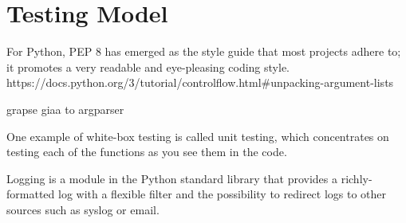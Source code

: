 \section{Testing Model}
For Python, PEP 8 has emerged as the style guide that most projects adhere to; it promotes a very readable and eye-pleasing coding style. https://docs.python.org/3/tutorial/controlflow.html#unpacking-argument-lists


grapse giaa to argparser

One example of white-box testing is called unit testing, which concentrates
on testing each of the functions as you see them in the code.

Logging is a module in the Python standard library that provides a richly-formatted log with a flexible filter and the possibility to redirect logs to other sources such as syslog or email.
